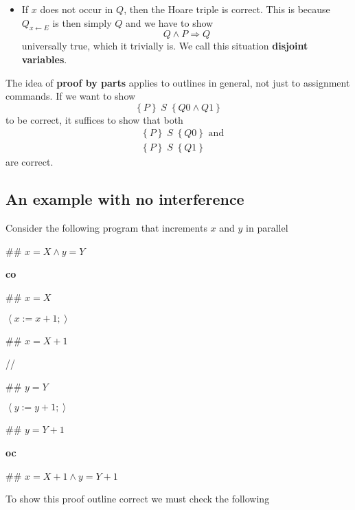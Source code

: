 \documentclass[11pt]{article}%
\begin{document}
\begin{itemize}
\item If $x$ does not occur in $Q$, then the Hoare triple is correct. This is
because $Q_{x\leftarrow E}$ is then simply $Q$ and we have to show%
\[
Q\wedge P\Rightarrow Q
\]
universally true, which it trivially is. We call this situation
\textbf{disjoint variables}.
\end{itemize}

The idea of \textbf{proof by parts} applies to outlines in general, not just
to assignment commands. If we want to show%
\[
\left\{  P\right\}  \;S\;\left\{  Q0\wedge Q1\right\}
\]
to be correct, it suffices to show that both%
\begin{align*}
&  \left\{  P\right\}  \;S\;\left\{  Q0\right\}  \text{ and}\\
&  \left\{  P\right\}  \;S\;\left\{  Q1\right\}
\end{align*}
are correct.

\subsection{An example with no interference}

Consider the following program that increments $x$ and $y$ in parallel

\begin{code}
\#\# $x=X\wedge y=Y$

\textbf{co}

\begin{indent}
\item \#\# $x=X$

\item $\left\langle x:=x+1;\right\rangle $

\item \#\# $x=X+1$
\end{indent}

//

\begin{indent}
\item \#\# $y=Y$

\item $\left\langle y:=y+1;\right\rangle $

\item \#\# $y=Y+1$
\end{indent}

\textbf{oc}

\#\# $x=X+1\wedge y=Y+1$
\end{code}

To show this proof outline correct we must check the following
\end{document}
